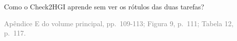 \documentclass{beamer}
\begin{document}
\begin{frame}[noframenumbering]{Como o Check2HGI aprende sem ver os rótulos das duas tarefas?}
\begin{itemize}
    \end{itemize}
    \vfill
    {\scriptsize
    \begin{minipage}[b]{0.775\linewidth}\raggedright\textcolor{gray}{Apêndice E do volume principal, pp.~109-113; Figura 9, p.~111; Tabela 12, p.~117.}\end{minipage}\hfill
    \begin{minipage}[b]{0.20\linewidth}\raggedleft \hyperlink{b0}{}\end{minipage}}
\end{frame}

\end{document}
